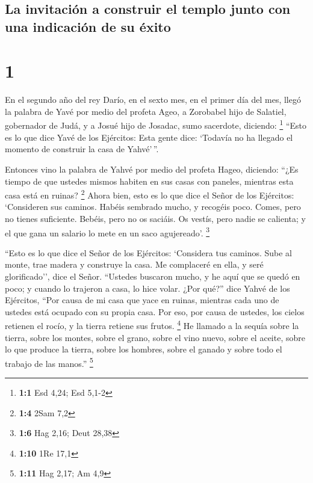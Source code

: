 \hypertarget{la-invitaciuxf3n-a-construir-el-templo-junto-con-una-indicaciuxf3n-de-su-uxe9xito}{%
\subsection{La invitación a construir el templo junto con una indicación
de su
éxito}\label{la-invitaciuxf3n-a-construir-el-templo-junto-con-una-indicaciuxf3n-de-su-uxe9xito}}

\hypertarget{section}{%
\section{1}\label{section}}

 En el segundo año del rey Darío, en el sexto mes, en el
primer día del mes, llegó la palabra de Yavé por medio del profeta Ageo,
a Zorobabel hijo de Salatiel, gobernador de Judá, y a Josué hijo de
Josadac, sumo sacerdote, diciendo: \footnote{\textbf{1:1} Esd 4,24; Esd
  5,1-2}  ``Esto es lo que dice Yavé de los Ejércitos:
Esta gente dice: `Todavía no ha llegado el momento de construir la casa
de Yahvé'\,''.

 Entonces vino la palabra de Yahvé por medio del profeta
Hageo, diciendo:  ``¿Es tiempo de que ustedes mismos
habiten en sus casas con paneles, mientras esta casa está en ruinas?
\footnote{\textbf{1:4} 2Sam 7,2}  Ahora bien, esto es lo
que dice el Señor de los Ejércitos: `Consideren sus caminos.
 Habéis sembrado mucho, y recogéis poco. Comes, pero no
tienes suficiente. Bebéis, pero no os saciáis. Os vestís, pero nadie se
calienta; y el que gana un salario lo mete en un saco agujereado'.
\footnote{\textbf{1:6} Hag 2,16; Deut 28,38}

 ``Esto es lo que dice el Señor de los Ejércitos:
`Considera tus caminos.  Sube al monte, trae madera y
construye la casa. Me complaceré en ella, y seré glorificado'', dice el
Señor.  ``Ustedes buscaron mucho, y he aquí que se quedó
en poco; y cuando lo trajeron a casa, lo hice volar. ¿Por qué?'' dice
Yahvé de los Ejércitos, ``Por causa de mi casa que yace en ruinas,
mientras cada uno de ustedes está ocupado con su propia casa.
 Por eso, por causa de ustedes, los cielos retienen el
rocío, y la tierra retiene sus frutos. \footnote{\textbf{1:10} 1Re 17,1}
 He llamado a la sequía sobre la tierra, sobre los
montes, sobre el grano, sobre el vino nuevo, sobre el aceite, sobre lo
que produce la tierra, sobre los hombres, sobre el ganado y sobre todo
el trabajo de las manos.'' \footnote{\textbf{1:11} Hag 2,17; Am 4,9}

